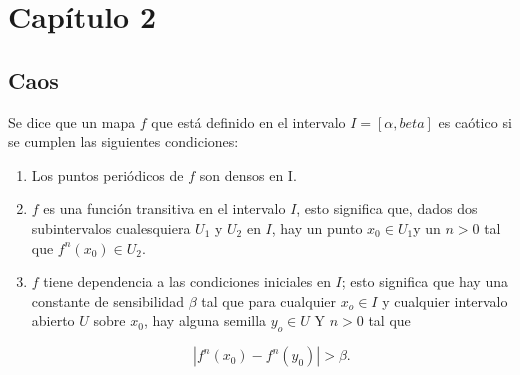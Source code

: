 \chapter*{Capítulo 2}
\label{Fundamentos de Cifrado Basado en Caos}
\section{Caos}

Se dice que un mapa $f$ que está definido en el intervalo $I= [\alpha, beta]$ es caótico si se cumplen las siguientes condiciones:

\begin{enumerate}
\item Los puntos periódicos de $f$ son densos en I.
\item $f$ es una función transitiva en el intervalo $I$, esto significa que, dados dos subintervalos cualesquiera $U_{1}$ y $U_{2}$ en $I$, hay un punto $x_{0} \in U_{1}$y un $n>0$ tal que $f^{n}(x_{0}) \in U_{2}$.
\item $f$ tiene dependencia  a las condiciones iniciales en $I$; esto significa que hay una constante de sensibilidad $\beta$ tal que para cualquier $x_{o} \in I$ y cualquier intervalo abierto $U$ sobre $x_{0}$, hay alguna semilla $y_{o} \in U$ Y $n >0$ tal que

\begin{equation}
|f^{n}(x_{0}) - f^{n}(y_{0}) | > \beta.
\end{equation} 
\end{enumerate}